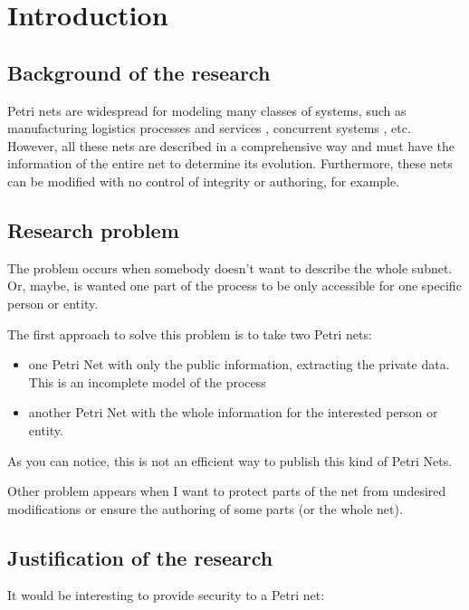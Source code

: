 
\chapter{Introduction} %

\label{Chapter1} %



\section{Background of the research}
Petri nets are widespread for modeling many
classes of systems, such as manufacturing logistics processes and services
\citep{SM-Jimenez2004143,SM-Guasch2002}, concurrent systems \citep{EPN-Jensen2009},
etc. However, all these nets are described in a comprehensive way and must have the information of the entire net to determine
its evolution.
Furthermore, these nets can be modified with no control of integrity or authoring,
for example. 
\section{Research problem}
The problem occurs when somebody doesn't want to describe the whole subnet.
Or, maybe, is wanted one part of the process to be only accessible for one
specific person or entity.


The first approach to solve this problem is to
take two Petri nets:


\begin{itemize}
\item
one Petri Net with only the public information, extracting the private data. This
is an incomplete model of the process
\item
another Petri Net with the whole information
for the interested person or entity.

\end{itemize}  

As you can notice, this is not an efficient way to publish this kind of Petri
Nets.

Other problem appears when I want to protect parts of the net from undesired
modifications or ensure the authoring of some parts (or the whole net).


\section{Justification of the research}
It would be interesting to provide security to a Petri net:


